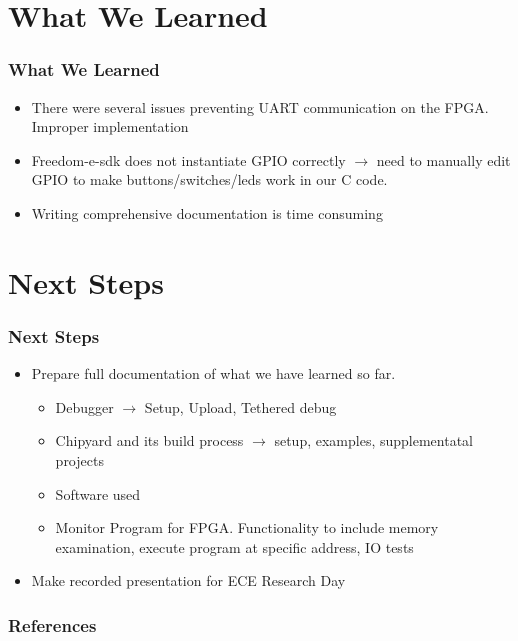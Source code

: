 \documentclass{../weeklyslides}
\begin{document}
\section{What We Learned}\label{sec:What_We_Learned}
\begin{frame}
  \frametitle{What We Learned}
  \begin{itemize}
  	\item There were several issues preventing UART communication on the FPGA. Improper implementation
  	\item Freedom-e-sdk does not instantiate GPIO correctly $\rightarrow$ need to manually edit GPIO to make buttons/switches/leds work in our C code.
  	\item Writing comprehensive documentation is time consuming
  \end{itemize}
\end{frame}

\section{Next Steps}\label{sec:Next_Steps}
\begin{frame}
  \frametitle{Next Steps}
  \begin{itemize}
  \item Prepare full documentation of what we have learned so far.
    \begin{itemize}
    \item Debugger $\rightarrow$ Setup, Upload, Tethered debug
    \item Chipyard and its build process $\rightarrow$ setup, examples, supplementatal projects
    \item Software used
    \item Monitor Program for FPGA. Functionality to include memory examination, execute program at specific address, IO tests
    \end{itemize}
  \item Make recorded presentation for ECE Research Day
  \end{itemize}
\end{frame}

\begin{frame}
  \frametitle{References}
  
  \printbibliography[heading=bibintoc]{}
\end{frame}
\end{document}
